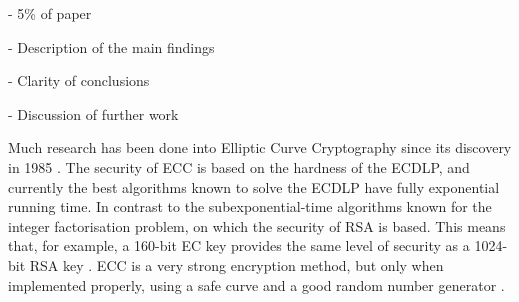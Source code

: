 \documentclass[12pt,a4paper]{article}
\begin{document}
- 5\% of paper

- Description of the main findings

- Clarity of conclusions

- Discussion of further work

Much research has been done into Elliptic Curve Cryptography since its discovery in 1985 \cite{10.1007/3-540-39799-X_31,koblitz1987elliptic}. 
The security of ECC is based on the hardness of the ECDLP, 
and currently the best algorithms known to solve the ECDLP have fully exponential running time. 
In contrast to the subexponential-time algorithms known for the integer factorisation problem, 
on which the security of RSA is based. 
This means that, for example, a 160-bit EC key provides the same level of security as a 1024-bit RSA key \cite{hankerson2003guide,silverman2009arithmetic}. 
ECC is a very strong encryption method, but only when implemented properly, 
using a safe curve \cite{bernstein2013safecurves,10.1007/11745853_14}
and a good random number generator \cite{hotz2010console}. 



\end{document}

